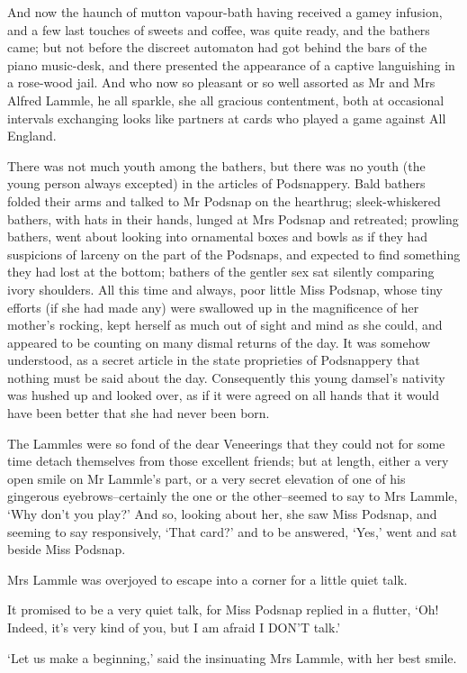 And now the haunch of mutton vapour-bath having received a gamey
infusion, and a few last touches of sweets and coffee, was quite ready,
and the bathers came; but not before the discreet automaton had got
behind the bars of the piano music-desk, and there presented the
appearance of a captive languishing in a rose-wood jail. And who now
so pleasant or so well assorted as Mr and Mrs Alfred Lammle, he all
sparkle, she all gracious contentment, both at occasional intervals
exchanging looks like partners at cards who played a game against All
England.

There was not much youth among the bathers, but there was no youth
(the young person always excepted) in the articles of Podsnappery. Bald
bathers folded their arms and talked to Mr Podsnap on the hearthrug;
sleek-whiskered bathers, with hats in their hands, lunged at Mrs Podsnap
and retreated; prowling bathers, went about looking into ornamental
boxes and bowls as if they had suspicions of larceny on the part of the
Podsnaps, and expected to find something they had lost at the bottom;
bathers of the gentler sex sat silently comparing ivory shoulders. All
this time and always, poor little Miss Podsnap, whose tiny efforts (if
she had made any) were swallowed up in the magnificence of her mother’s
rocking, kept herself as much out of sight and mind as she could,
and appeared to be counting on many dismal returns of the day. It was
somehow understood, as a secret article in the state proprieties of
Podsnappery that nothing must be said about the day. Consequently this
young damsel’s nativity was hushed up and looked over, as if it were
agreed on all hands that it would have been better that she had never
been born.

The Lammles were so fond of the dear Veneerings that they could not for
some time detach themselves from those excellent friends; but at length,
either a very open smile on Mr Lammle’s part, or a very secret elevation
of one of his gingerous eyebrows--certainly the one or the other--seemed
to say to Mrs Lammle, ‘Why don’t you play?’ And so, looking about her,
she saw Miss Podsnap, and seeming to say responsively, ‘That card?’ and
to be answered, ‘Yes,’ went and sat beside Miss Podsnap.

Mrs Lammle was overjoyed to escape into a corner for a little quiet
talk.

It promised to be a very quiet talk, for Miss Podsnap replied in a
flutter, ‘Oh! Indeed, it’s very kind of you, but I am afraid I DON’T
talk.’

‘Let us make a beginning,’ said the insinuating Mrs Lammle, with her
best smile.


